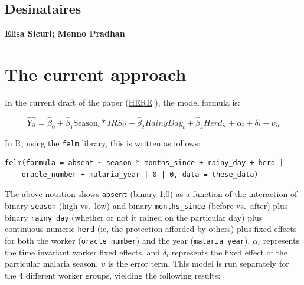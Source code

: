 \documentclass[]{article}
\begin{document}
\vfill
\null

\subsection*{Desinataires}

\textbf{Elisa Sicuri; Menno Pradhan}

\vspace{3mm}

\newpage

\section{The current approach}\label{the-current-approach}

In the current draft of the paper
(\href{https://docs.google.com/document/d/1bUWRBCgVcgjSPHchIQxiTG8Vwv5hV1GLU4Tlu386sWA/edit#}{HERE}
), the model formula is:

\[
\hat{Y_{it}} = \hat{\beta}_{0} +  \hat{\beta}_{1}\text{Season}_{t} * IRS_{it} + \hat{\beta}_2{RainyDay_{t}} + \hat{\beta}_3{Herd_{it}} +  \alpha_i + \delta_t + \upsilon_{it}
\]

In R, using the \texttt{felm} library, this is written as follows:

\begin{verbatim}
felm(formula = absent ~ season * months_since + rainy_day + herd | 
    oracle_number + malaria_year | 0 | 0, data = these_data)
\end{verbatim}

The above notation shows \texttt{absent} (binary 1,0) as a function of
the interaction of binary \texttt{season} (high vs.~low) and binary
\texttt{months\_since} (before vs.~after) plus binary
\texttt{rainy\_day} (whether or not it rained on the particular day)
plus continuous numeric \texttt{herd} (ie, the protection afforded by
others) plus fixed effects for both the worker (\texttt{oracle\_number})
and the year (\texttt{malaria\_year}). \(\alpha_i\) represents the time
invariant worker fixed effects, and \(\delta_i\) represents the fixed
effect of the particular malaria season. \(\upsilon\) is the error term.
This model is run separately for the 4 different worker groups, yielding
the following results:
\end{document}
